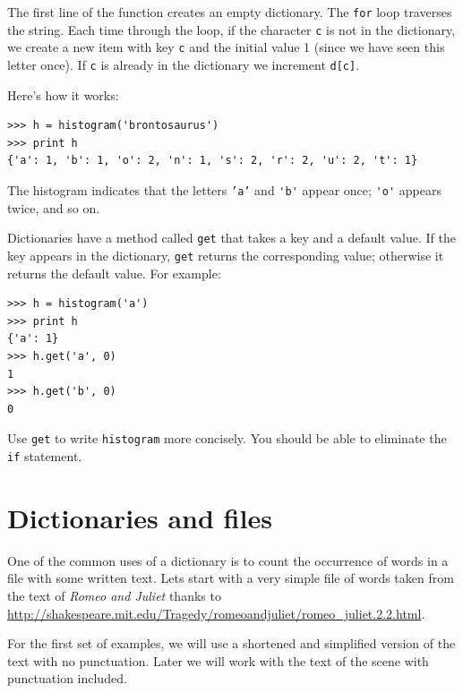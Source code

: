 \documentclass[10pt]{book}
\begin{document}

The first line of the
function creates an empty dictionary.  The {\tt for} loop traverses
the string.  Each time through the loop, if the character {\tt c} is
not in the dictionary, we create a new item with key {\tt c} and the
initial value 1 (since we have seen this letter once).  If {\tt c} is
already in the dictionary we increment {\tt d[c]}.


Here's how it works:

\beforeverb
\begin{verbatim}
>>> h = histogram('brontosaurus')
>>> print h
{'a': 1, 'b': 1, 'o': 2, 'n': 1, 's': 2, 'r': 2, 'u': 2, 't': 1}
\end{verbatim}
\afterverb
%
The histogram indicates that the letters {\tt 'a'} and \verb"'b'"
appear once; \verb"'o'" appears twice, and so on.

\begin{ex}


Dictionaries have a method called {\tt get} that takes a key
and a default value.  If the key appears in the dictionary,
{\tt get} returns the corresponding value; otherwise it returns
the default value.  For example:

\beforeverb
\begin{verbatim}
>>> h = histogram('a')
>>> print h
{'a': 1}
>>> h.get('a', 0)
1
>>> h.get('b', 0)
0
\end{verbatim}
\afterverb
%
Use {\tt get} to write {\tt histogram} more concisely.  You
should be able to eliminate the {\tt if} statement.
\end{ex}

\section{Dictionaries and files}

One of the common uses of a dictionary is to count the occurrence
of words in a file with some written text.  
Lets start with a very simple file of
words taken from the text of {\em Romeo and Juliet}
thanks to 
\url{http://shakespeare.mit.edu/Tragedy/romeoandjuliet/romeo_juliet.2.2.html}.

For the first set of examples, we will use a shortened and simplified version
of the text with no punctuation.  Later we will work with the text of the 
scene with punctuation included.
\end{document}
